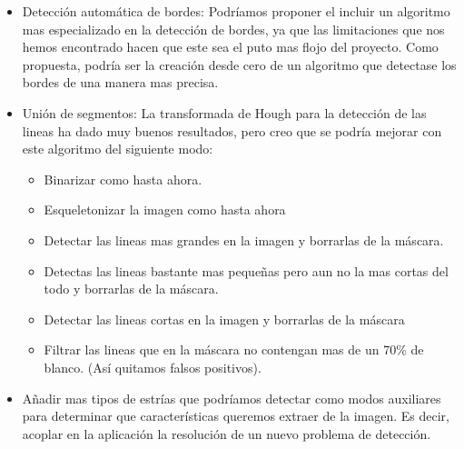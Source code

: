 \begin{itemize}
	\item Detección automática de bordes: 
Podríamos proponer el incluir un algoritmo mas especializado en la detección de bordes, ya que las limitaciones que nos hemos encontrado hacen que este sea el puto mas flojo del proyecto. Como propuesta, podría ser la creación desde cero de un algoritmo que detectase los bordes de una manera mas precisa.

	\item Unión de segmentos: 
La transformada de Hough para la detección de las lineas ha dado muy buenos resultados, pero creo que se podría mejorar con este algoritmo del siguiente modo:

	\begin{itemize}
		\item Binarizar como hasta ahora.
		\item Esqueletonizar la imagen como hasta ahora
		\item Detectar las lineas mas grandes en la imagen y borrarlas de la máscara.
		\item Detectas las lineas bastante mas pequeñas pero aun no la mas cortas del todo y borrarlas de la máscara.
		\item Detectar las lineas cortas en la imagen y borrarlas de la máscara
		\item Filtrar las lineas que en la máscara no contengan mas de un 70\% de blanco. (Así quitamos falsos positivos).
	\end{itemize}
	\item Añadir mas tipos de estrías que podríamos detectar como modos auxiliares para determinar que características queremos extraer de la imagen. Es decir, acoplar en la aplicación la resolución de un nuevo problema de detección.
	
\end{itemize}